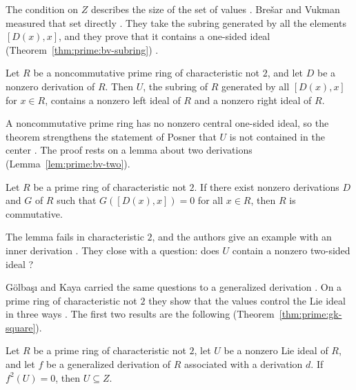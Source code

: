 The condition on $Z$ describes the size of the set of values
\cite[p.~133]{BresarVukman1993}. Bre\v{s}ar and Vukman measured that set
directly \cite[p.~133]{BresarVukman1993}. They take the subring generated by
all the elements $[D(x),x]$, and they prove that it contains a one-sided ideal
(Theorem~\ref{thm:prime:bv-subring}) \cite[p.~133]{BresarVukman1993}.

\begin{theorem}\label{thm:prime:bv-subring}
Let $R$ be a noncommutative prime ring of characteristic not $2$, and let $D$ be a
nonzero derivation of $R$. Then $U$, the subring of $R$ generated by all
$[D(x),x]$ for $x\in R$, contains a nonzero left ideal of $R$ and a nonzero right
ideal of $R$.
\end{theorem}

A noncommutative prime ring has no nonzero central one-sided ideal, so the
theorem strengthens the statement of Posner that $U$ is not contained in the
center \cite[p.~133]{BresarVukman1993}. The proof rests on a lemma about two
derivations (Lemma~\ref{lem:prime:bv-two}).

\begin{lemma}\label{lem:prime:bv-two}
Let $R$ be a prime ring of characteristic not $2$. If there exist nonzero
derivations $D$ and $G$ of $R$ such that $G([D(x),x])=0$ for all $x\in R$, then $R$
is commutative.
\end{lemma}

The lemma fails in characteristic $2$, and the authors give an example with an
inner derivation \cite[p.~134]{BresarVukman1993}. They close with a question:
does $U$ contain a nonzero two-sided ideal \cite[p.~141]{BresarVukman1993}?

G\"olba\c{s}{\i} and Kaya carried the same questions to a generalized
derivation \cite[p.~862]{GolbasiKaya2006}. On a prime ring of characteristic
not $2$ they show that the values control the Lie ideal in three ways
\cite[Theorem~1, p.~864]{GolbasiKaya2006}. The first two results are the
following (Theorem~\ref{thm:prime:gk-square}).

\begin{theorem}\label{thm:prime:gk-square}
Let $R$ be a prime ring of characteristic not $2$, let $U$ be a nonzero Lie ideal
of $R$, and let $f$ be a generalized derivation of $R$ associated with a derivation
$d$. If $f^{2}(U)=0$, then $U\subseteq Z$.
\end{theorem}

